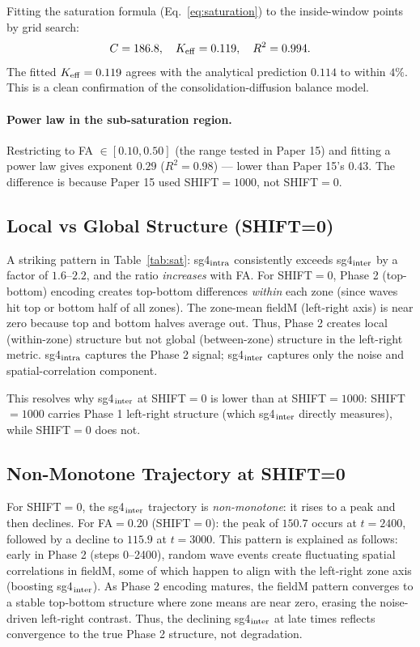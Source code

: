 \documentclass[11pt]{article}
\begin{document}
Fitting the saturation formula (Eq.~\ref{eq:saturation}) to the
inside-window points by grid search:
\begin{equation}
C = 186.8, \quad K_{\rm eff} = 0.119, \quad R^2 = 0.994.
\end{equation}
The fitted $K_{\rm eff} = 0.119$ agrees with the analytical prediction
$0.114$ to within $4\%$.
This is a clean confirmation of the consolidation-diffusion balance model.

\paragraph{Power law in the sub-saturation region.}
Restricting to FA $\in [0.10, 0.50]$ (the range tested in Paper 15) and fitting
a power law gives exponent $0.29$ ($R^2 = 0.98$) --- lower than Paper 15's $0.43$.
The difference is because Paper 15 used SHIFT$=1000$, not SHIFT$=0$.

\subsection{Local vs Global Structure (SHIFT=0)}

A striking pattern in Table~\ref{tab:sat}: sg4$_{\rm intra}$ consistently
exceeds sg4$_{\rm inter}$ by a factor of $1.6$--$2.2$, and the ratio
\emph{increases} with FA.
For SHIFT$=0$, Phase 2 (top-bottom) encoding creates top-bottom differences
\emph{within} each zone (since waves hit top or bottom half of all zones).
The zone-mean fieldM (left-right axis) is near zero because top and bottom
halves average out.
Thus, Phase 2 creates local (within-zone) structure but not global
(between-zone) structure in the left-right metric.
sg4$_{\rm intra}$ captures the Phase 2 signal; sg4$_{\rm inter}$ captures
only the noise and spatial-correlation component.

This resolves why sg4$_{\rm inter}$ at SHIFT$=0$ is lower than at SHIFT$=1000$:
SHIFT$=1000$ carries Phase 1 left-right structure (which sg4$_{\rm inter}$
directly measures), while SHIFT$=0$ does not.

\subsection{Non-Monotone Trajectory at SHIFT=0}

For SHIFT$=0$, the sg4$_{\rm inter}$ trajectory is \emph{non-monotone}:
it rises to a peak and then declines.
For FA$=0.20$ (SHIFT$=0$): the peak of $150.7$ occurs at $t=2400$, followed
by a decline to $115.9$ at $t=3000$.
This pattern is explained as follows: early in Phase 2 (steps 0--2400),
random wave events create fluctuating spatial correlations in fieldM,
some of which happen to align with the left-right zone axis (boosting sg4$_{\rm inter}$).
As Phase 2 encoding matures, the fieldM pattern converges to a stable
top-bottom structure where zone means are near zero, erasing the
noise-driven left-right contrast.
Thus, the declining sg4$_{\rm inter}$ at late times reflects convergence
to the true Phase 2 structure, not degradation.
\end{document}
